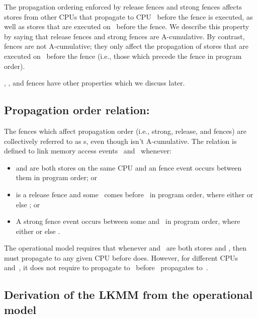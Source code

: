 The propagation ordering enforced by release fences and strong fences
affects stores from other CPUs that propagate to CPU~ before the
fence is executed, as well as stores that are executed on~ before the
fence.
We describe this property by saying that release fences and
strong fences are A-cumulative.
By contrast,  fences are not A-cumulative; they only
affect the propagation of stores that are executed on~ before
the fence (i.e., those which precede the fence in program order).

, , and 
fences have other properties which we discuss later.


\subsection{Propagation order relation: }
\label{sec:docs:explanation:Propagation Order Releation: cumul-fence}

The fences which affect propagation order (i.e., strong, release, and
 fences) are collectively referred to as s, even
though  isn't A-cumulative.
The  relation is defined to link memory access events~
and~ whenever:

\begin{itemize}
\item	{} and  are both stores on the same CPU and an  fence
	event occurs between them in program order; or

\item	{} is a release fence and some ~comes before~ in program order,
	where either  or else ; or

\item	A strong fence event occurs between some  and~ in program
	order, where either  or else .
\end{itemize}

The operational model requires that whenever  and~ are both stores
and , then  must propagate to any given CPU
before  does.
However, for different CPUs~ and~, it does not
require  to propagate to~ before~ propagates to~.


\subsection{Derivation of the LKMM from the operational model}
\label{sec:docs:explanation:Derivation of The LKMM from The Operational Model}

